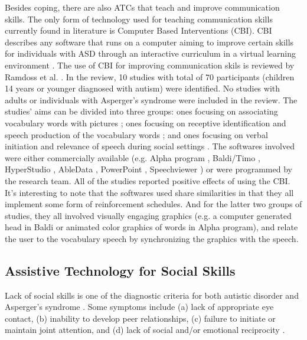 \documentclass{ut-thesis}
\begin{document}
Besides coping, there are also ATCs that teach and improve communication skills.  The only form of technology used for teaching communication skills currently found in literature is Computer Based Interventions (CBI).  CBI describes any software that runs on a computer aiming to improve certain skills for individuals with ASD through an interactive curriculum in a virtual learning environment \cite{lang2014assistive}.  The use of CBI for improving communication skils is reviewed by Ramdoss et al. \cite{ramdoss2011use}.  In the review, 10 studies with total of 70 participants (children 14 years or younger diagnosed with autism) were identified.  No studies with adults or individuals with Asperger's syndrome were included in the review.  The studies' aims can be divided into three groups: ones focusing on associating vocabulary words with pictures \cite{moore2000brief, hetzroni2005logos}; ones focusing on receptive identification and speech production of the vocabulary words \cite{heimann1995increasing, bernard1999enhancing, bosseler2003development, coleman2005using, massaro2006read}; and ones focusing on verbal initiation and relevance of speech during social settings \cite{parsons1993effect, simpson2004embedded, hetzroni2004effects}.  The softwares involved were either commercially available (e.g. Alpha program \cite{abledata2010alpha}, Baldi/Timo \cite{2005team}, HyperStudio \cite{mackiev2010welcome}, AbleData \cite{abledata2010alpha}, PowerPoint \cite{1997microsoft}, Speechviewer \cite{synapse2010the}) or were programmed by the research team.  All of the studies reported positive effects of using the CBI.  It's interesting to note that the softwares used share similarities in that they all implement some form of reinforcement schedules.  And for the latter two groups of studies, they all involved visually engaging graphics (e.g. a computer generated head in Baldi or animated color graphics of words in Alpha program), and relate the user to the vocabulary speech by synchronizing the graphics with the speech.


\subsection{Assistive Technology for Social Skills}
Lack of social skills is one of the diagnostic criteria for both autistic disorder and Asperger's syndrome \cite{spitzer1980diagnostic}.  Some symptoms include (a) lack of appropriate eye contact, (b) inability to develop peer relationships, (c) failure to initiate or maintain joint attention, and (d) lack of social and/or emotional reciprocity \cite{rao2008social}.
\end{document}
